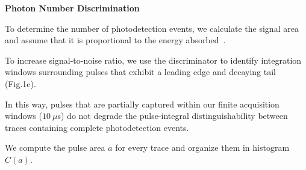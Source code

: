\begin{center}
  \begin{center} {\bf \Large \textsf {Photon Number Discrimination}}\end{center}
\end{center}

To determine the number of photodetection events, we calculate the signal area and assume that it is proportional to the energy absorbed~\cite{Cabrera2000509}.

To increase signal-to-noise ratio, we use the discriminator 
to identify integration windows surrounding pulses 
that exhibit a leading edge and decaying tail (Fig.1c).

In this way, pulses that are partially captured within our finite acquisition windows ($10~\mu$s) do not degrade the pulse-integral distinguishability between traces containing complete photodetection events.

We compute the pulse area $a$ for every trace
and organize them in histogram $C(a)$.

